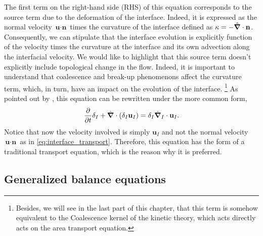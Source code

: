 The first term on the right-hand side (RHS) of this equation corresponds to the source term due to the deformation of the interface.
Indeed, it is expressed as the normal velocity $\textbf{u}\cdot\textbf{n}$ times the curvature of the interface defined as $\kappa = - \hat{\bm{\nabla}} \cdot \textbf{n}$.
Consequently, we can stipulate that the interface evolution is explicitly function of the velocity times the curvature at the interface and its own advection along the interfacial velocity. 
We would like to highlight that this source term doesn't explicitly include topological change in the flow. 
Indeed, it is important to understand that coalescence and break-up phenomenons affect the curvature term, which, in turn, have an impact on the evolution of the interface. 
\footnote{Besides, we will see in the last part of this chapter, that this term is somehow equivalent to the Coalescence kernel of the kinetic theory, which acts directly acts on the area transport equation.} 
As pointed out by \citet{morel2007surface}, this equation can be rewritten under the more common form,
\begin{equation}
    \frac{\partial}{\partial t} \delta_I
    + \hat{\bm{\nabla}} \cdot (\delta_I \textbf{u}_I)
    = \delta_I \hat{\bm{\nabla}}_I \cdot \textbf{u}_I.
    \label{eq:interface_transport2}
\end{equation}
Notice that now the velocity involved is simply $\textbf{u}_I$ and not the normal velocity $\textbf{u} \cdot \textbf{n}$ as in \ref{eq:interface_transport}.
Therefore, this equation has the form of a traditional transport equation, which is the reason why it is preferred. 

\subsection{Generalized balance equations}

